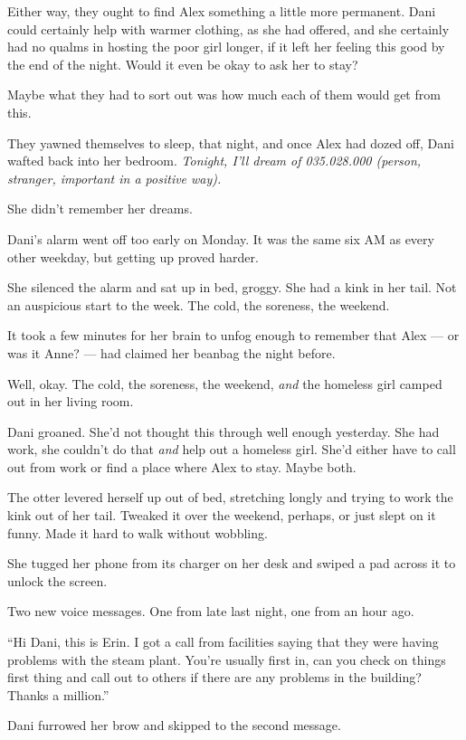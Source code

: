 Either way, they ought to find Alex something a little more permanent. Dani could certainly help with warmer clothing, as she had offered, and she certainly had no qualms in hosting the poor girl longer, if it left her feeling this good by the end of the night. Would it even be okay to ask her to stay?

Maybe what they had to sort out was how much each of them would get from this.

They yawned themselves to sleep, that night, and once Alex had dozed off, Dani wafted back into her bedroom. \emph{Tonight, I'll dream of 035.028.000 (person, stranger, important in a positive way).}

She didn't remember her dreams.

\secdiv

Dani's alarm went off too early on Monday. It was the same six AM as every other weekday, but getting up proved harder.

She silenced the alarm and sat up in bed, groggy. She had a kink in her tail. Not an auspicious start to the week. The cold, the soreness, the weekend.

It took a few minutes for her brain to unfog enough to remember that Alex --- or was it Anne? --- had claimed her beanbag the night before.

Well, okay. The cold, the soreness, the weekend, \emph{and} the homeless girl camped out in her living room.

Dani groaned. She'd not thought this through well enough yesterday. She had work, she couldn't do that \emph{and} help out a homeless girl. She'd either have to call out from work or find a place where Alex to stay. Maybe both.

The otter levered herself up out of bed, stretching longly and trying to work the kink out of her tail. Tweaked it over the weekend, perhaps, or just slept on it funny. Made it hard to walk without wobbling.

She tugged her phone from its charger on her desk and swiped a pad across it to unlock the screen.

Two new voice messages. One from late last night, one from an hour ago.

``Hi Dani, this is Erin. I got a call from facilities saying that they were having problems with the steam plant. You're usually first in, can you check on things first thing and call out to others if there are any problems in the building? Thanks a million.''

Dani furrowed her brow and skipped to the second message.


